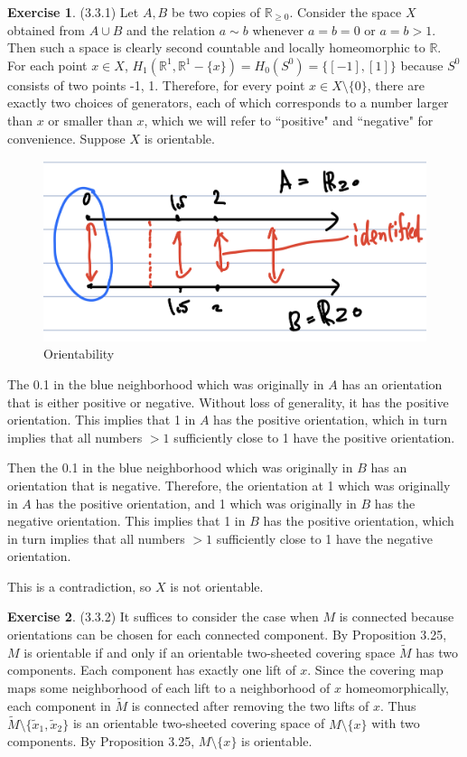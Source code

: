 \documentclass[12pt, psamsfonts]{amsart}
\theoremstyle{definition}
\newtheorem*{exer}{Exercise}
\theoremstyle{remark}
\numberwithin{equation}{section}
\begin{document}
\begin{exer}{(3.3.1)}
  Let $A, B$ be two copies of $\mathbb{R}_{\geq 0}$.
  Consider the space $X$ obtained from $A \cup B$ and the relation $a \sim b$ whenever $a = b = 0$ or $a = b > 1$.
  Then such a space is clearly second countable and locally homeomorphic to $\mathbb{R}$.
  For each point $x \in X$, $H_1(\mathbb{R}^1, \mathbb{R}^1 - \{ x \}) = H_0(S^0) = \{ [-1], [1] \}$ because $S^0$ consists of two points -1, 1.
  Therefore, for every point $x \in X \setminus \{ 0 \}$, there are exactly two choices of generators, each of which corresponds to a number larger than $x$ or smaller than $x$, which we will refer to ``positive" and ``negative" for convenience.
  Suppose $X$ is orientable.
  \begin{figure}[!htb]
  \includegraphics[width=.5\linewidth]{orientability.jpeg}
  \caption{Orientability}
  \label{fig:orientability}
  \end{figure}
  The 0.1 in the blue neighborhood which was originally in $A$ has an orientation that is either positive or negative.
  Without loss of generality, it has the positive orientation.
  This implies that 1 in $A$ has the positive orientation, which in turn implies that all numbers $> 1$ sufficiently close to 1 have the positive orientation.

  Then the 0.1 in the blue neighborhood which was originally in $B$ has an orientation that is negative.
  Therefore, the orientation at 1 which was originally in $A$ has the positive orientation, and 1 which was originally in $B$ has the negative orientation.
  This implies that 1 in $B$ has the positive orientation, which in turn implies that all numbers $> 1$ sufficiently close to 1 have the negative orientation.

  This is a contradiction, so $X$ is not orientable.
\end{exer}

\begin{exer}{(3.3.2)}
  It suffices to consider the case when $M$ is connected because orientations can be chosen for each connected component.
  By Proposition 3.25, $M$ is orientable if and only if an orientable two-sheeted covering space $\tilde{M}$ has two components.
  Each component has exactly one lift of $x$.
  Since the covering map maps some neighborhood of each lift to a neighborhood of $x$ homeomorphically, each component in $\tilde{M}$ is connected after removing the two lifts of $x$.
  Thus $\tilde{M} \setminus \{ \tilde{x}_1, \tilde{x}_2 \}$ is an orientable two-sheeted covering space of $M \setminus \{ x \}$ with two components.
  By Proposition 3.25, $M \setminus \{ x \}$ is orientable.
\end{exer}
\end{document}
